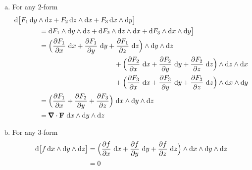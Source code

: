 \begin{eg}
\begin{enumerate}[(a)]
\item %
For any $2$-form
\begin{align*}
&\dee{}\big[F_1\,\dee{y}\wedge\dee{z}
 + F_2\,\dee{z}\wedge\dee{x}
 + F_3\,\dee{x}\wedge\dee{y}\big]
\\
&\hskip0.5in=\dee{F_1}\wedge\dee{y}\wedge\dee{z} 
+ \dee{F_2}\wedge\dee{z}\wedge\dee{x}  
+ \dee{F_3}\wedge\dee{x}\wedge\dee{y}\big]
\\
&\hskip0.5in=\Big(\frac{\partial F_1}{\partial x}\ \dee{x}
      +\frac{\partial F_1}{\partial y}\ \dee{y}
      +\frac{\partial F_1}{\partial z}\ \dee{z}\Big)\wedge\dee{y}\wedge\dee{z}
   \\&\hskip2in
+\Big(\frac{\partial F_2}{\partial x}\ \dee{x}
      +\frac{\partial F_2}{\partial y}\ \dee{y}
      +\frac{\partial F_2}{\partial z}\ \dee{z}\Big)\wedge\dee{z}\wedge\dee{x}
   \\&\hskip2in
+\Big(\frac{\partial F_3}{\partial x}\ \dee{x}
      +\frac{\partial F_3}{\partial y}\ \dee{y}
      +\frac{\partial F_3}{\partial z}\ \dee{z}\Big)\wedge\dee{x}\wedge\dee{y}
\\
&\hskip0.5in=
  \Big(\frac{\partial F_1}{\partial x}
       +\frac{\partial F_2}{\partial y}
       +\frac{\partial F_3}{\partial z}\Big)
          \ \dee{x}\wedge\dee{y}\wedge\dee{z}
\\
&\hskip0.5in=
   \vnabla\cdot\vF\ \dee{x}\wedge\dee{y}\wedge\dee{z}
\end{align*}

\item %
For any $3$-form
\begin{align*}
\mathrm{d}\big[f\,\mathrm{d}x\wedge\mathrm{d}y\wedge\mathrm{d}z\big]
&=\Big(\frac{\partial f}{\partial x}\ \mathrm{d}x
      +\frac{\partial f}{\partial y}\ \mathrm{d}y
      +\frac{\partial f}{\partial z}\ \mathrm{d}z\Big)
    \wedge\mathrm{d}x\wedge\mathrm{d}y\wedge\mathrm{d}z\\
&=0
\end{align*}
\end{enumerate}
\end{eg}

